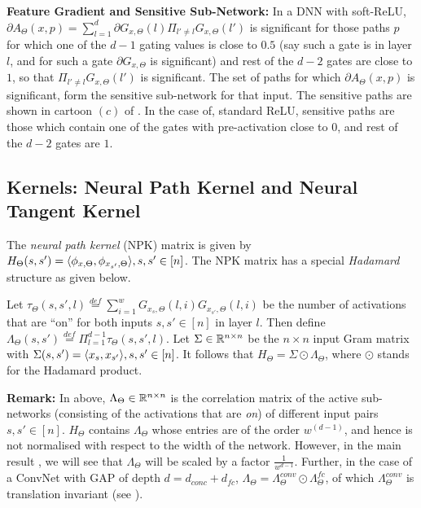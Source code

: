 \textbf{Feature Gradient and Sensitive Sub-Network:} In a DNN with soft-ReLU, $\partial A_{\Theta}(x,p)=\sum_{l=1}^d \partial G_{x,\Theta}(l)\Pi_{l'\neq l}G_{x,\Theta}(l')$ is significant for those paths $p$ for which one of the $d-1$ gating values is close to $0.5$ (say such a gate is in layer $l$, and for such a gate $\partial G_{x,\Theta}$ is significant) and rest of the $d-2$ gates are close to $1$, so that $\Pi_{l'\neq l}G_{x,\Theta}(l')$ is significant. The set of paths for which $\partial A_{\Theta}(x,p)$ is significant, form the sensitive sub-network for that input. The sensitive paths are shown in cartoon $(c)$ of . In the case of, standard ReLU, sensitive paths are those which contain one of the gates with pre-activation close to $0$, and rest of the $d-2$ gates are $1$.
\subsection{Kernels: Neural Path Kernel and Neural Tangent Kernel}\label{sec:ker}
The \emph{neural path kernel} (NPK) matrix is given by $H_{\Theta}(s,s')=\langle \phi_{x,\Theta},\phi_{x_{s'},\Theta}\rangle, s, s'\in[n]$. The NPK matrix has a special \emph{Hadamard} structure as given below.
\begin{lemma}\label{lm:npk}
Let $\tau_{\Theta}(s,s',l)\stackrel{def}=\sum_{i=1}^w G_{x_s,\Theta}(l,i)G_{x_{s'},\Theta}(l,i)$ be the number of activations that are ``on'' for both inputs $s,s'\in[n]$ in layer $l$. Then define $\Lambda_{\Theta}(s,s')\stackrel{def}=\Pi_{l=1}^{d-1}\tau_{\Theta}(s,s',l)$.
Let $\Sigma \in \mathbb{R}^{n\times n}$ be the $n\times n $ input Gram matrix with  $\Sigma(s,s')=\langle x_s,x_{s'}\rangle,s,s'\in[n]$. It follows that $H_{\Theta}= \Sigma\odot\Lambda_{\Theta}$, where $\odot$ stands for the Hadamard product. 
\end{lemma}
\textbf{Remark:} In  above, $\Lambda_{\Theta}\in\mathbb{R}^{n\times n}$ is the correlation matrix of the active sub-networks (consisting of the activations that are \emph{on}) of different input pairs $s,s'\in[n]$. $H_{\Theta}$ contains $\Lambda_{\Theta}$ whose entries are of the order $w^{(d-1)}$, and hence is not normalised with respect to the width of the network.  However, in the main result , we will see that $\Lambda_{\Theta}$ will be scaled by a factor $\frac{1}{w^{d-1}}$. Further, in the case of a ConvNet  with GAP of depth $d=d_{conc}+d_{fc}$, $\Lambda_{\Theta}=\Lambda^{conv}_{\Theta}\odot\Lambda^{fc}_{\Theta}$, of which $\Lambda^{conv}_{\Theta}$ is translation invariant (see ). 

